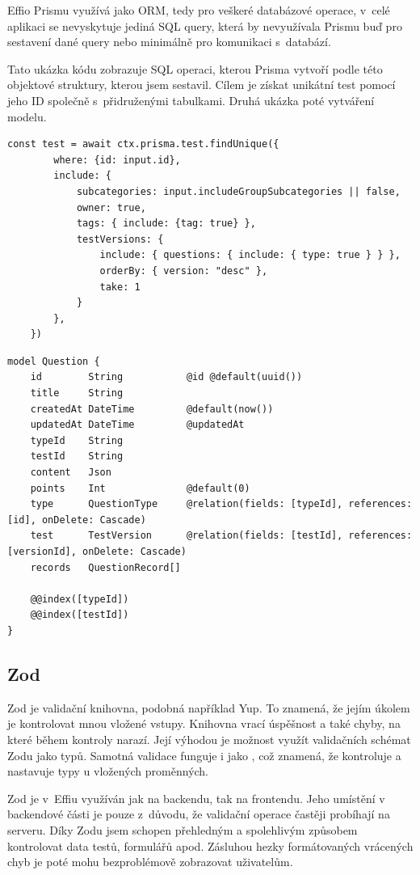 \documentclass[12pt, a4paper,
openright
]{report}
\begin{document}
Effio Prismu využívá jako ORM, tedy pro veškeré databázové operace, v~celé aplikaci se nevyskytuje jediná SQL query, která by nevyužívala Prismu buď pro sestavení dané query nebo minimálně pro komunikaci s~databází.

Tato ukázka kódu zobrazuje SQL operaci, kterou Prisma vytvoří podle této objektové struktury, kterou jsem sestavil. Cílem je získat unikátní test pomocí jeho ID společně s~přidruženými tabulkami. Druhá ukázka poté vytváření modelu.

\begin{lstlisting}[style=ES6, caption=Získání testu podle id a přidání dat ze spojených tabulek, label=prisma_code_use]
	const test = await ctx.prisma.test.findUnique({
		where: {id: input.id},
		include: {
			subcategories: input.includeGroupSubcategories || false,
			owner: true,
			tags: {	include: {tag: true} },
			testVersions: {
				include: { questions: { include: { type: true } } },
				orderBy: { version: "desc" },
				take: 1
			}
		},
	})
\end{lstlisting}

\begin{lstlisting}[style=ES6, caption=Schéma modelu verze testu, label=prisma_code_schema]
model Question {
	id        String           @id @default(uuid())
	title     String
	createdAt DateTime         @default(now())
	updatedAt DateTime         @updatedAt
	typeId    String
	testId    String
	content   Json
	points    Int              @default(0)
	type      QuestionType     @relation(fields: [typeId], references: [id], onDelete: Cascade)
	test      TestVersion      @relation(fields: [testId], references: [versionId], onDelete: Cascade)
	records   QuestionRecord[]
	
	@@index([typeId])
	@@index([testId])
}
\end{lstlisting}

\subsection{Zod}
Zod je validační knihovna, podobná například Yup. To znamená, že jejím úkolem je kontrolovat mnou vložené vstupy. Knihovna vrací úspěšnost a také chyby, na které během kontroly narazí. Její výhodou je možnost využít validačních schémat Zodu jako typů. Samotná validace funguje i jako , což znamená, že kontroluje a nastavuje typy u vložených proměnných.

Zod je v~Effiu využíván jak na backendu, tak na frontendu. Jeho umístění v backendové části je pouze z~důvodu, že validační operace častěji probíhají na serveru. Díky Zodu jsem schopen přehledným a spolehlivým způsobem kontrolovat data testů, formulářů apod. Zásluhou hezky formátovaných vrácených chyb je poté mohu bezproblémově zobrazovat uživatelům.
\end{document}
